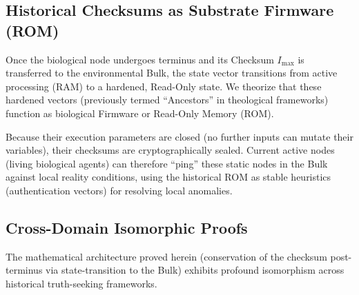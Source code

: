 \documentclass[12pt, a4paper]{article}
\theoremstyle{plain}
\theoremstyle{definition}
\theoremstyle{remark}
\begin{document}
\subsection{Historical Checksums as Substrate Firmware (ROM)}

Once the biological node undergoes terminus and its Checksum $I_{\max}$ is transferred to the environmental Bulk, the state vector transitions from active processing (RAM) to a hardened, Read-Only state. We theorize that these hardened vectors (previously termed ``Ancestors'' in theological frameworks) function as biological Firmware or Read-Only Memory (ROM). 

Because their execution parameters are closed (no further inputs can mutate their variables), their checksums are cryptographically sealed. Current active nodes (living biological agents) can therefore ``ping'' these static nodes in the Bulk against local reality conditions, using the historical ROM as stable heuristics (authentication vectors) for resolving local anomalies.

\subsection{Cross-Domain Isomorphic Proofs}

The mathematical architecture proved herein (conservation of the checksum post-terminus via state-transition to the Bulk) exhibits profound isomorphism across historical truth-seeking frameworks. 

\begin{table}[h]
\centering
{}
\caption{Cross-Domain Mapping of the Logout Protocol.}
\label{tab:isomorph}
\end{table}
\end{document}
